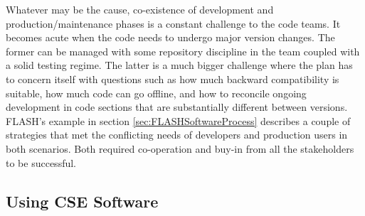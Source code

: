 Whatever may be the cause, co-existence of development and
production/maintenance phases is a constant challenge to the code
teams. It becomes acute when the code needs to undergo major version
changes. The former can be managed with some repository
discipline in the team coupled with a solid testing regime. The latter
is a much bigger challenge where the plan has to concern itself with
questions such as how much backward compatibility is suitable, how
much code can go offline, and how to reconcile ongoing development in
code sections that are substantially different between versions.
FLASH's example in section \ref{sec:FLASHSoftwareProcess} describes
a couple of strategies that met the conflicting needs of developers and
production users in both scenarios. Both required co-operation and
buy-in from all the stakeholders to be successful. 

\subsection{Using CSE Software}

